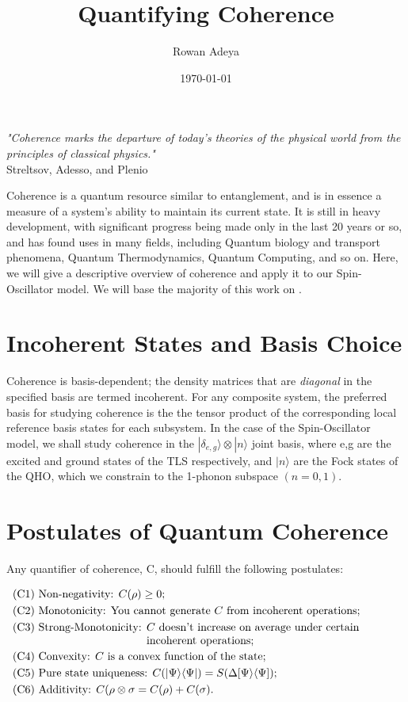 \documentclass[12pt]{article}
\title{Quantifying Coherence}
\author{Rowan Adeya}
\date{\today}
\begin{document}
\maketitle

\begin{center}
\textit{"Coherence marks the departure of today’s theories of the
physical world from the principles of classical physics."}\\ \small{Streltsov, Adesso, and Plenio\cite{...}}\\ 
\end{center}

Coherence is a quantum resource similar to entanglement, and is in essence a measure of a system's ability to maintain its current state. It is still in heavy development, with significant progress being made only in the last 20 years or so, and has found uses in many fields, including Quantum biology and transport phenomena, Quantum Thermodynamics, Quantum Computing, and so on\cite{...}. Here, we will give a descriptive overview of coherence and apply it to our Spin-Oscillator model. We will base the majority of this work on \cite{...}.

\section{Incoherent States and Basis Choice}
Coherence is basis-dependent; the density matrices that are \textit{diagonal} in the specified basis are termed incoherent. For any composite system, the preferred basis for studying coherence is the the tensor product of the corresponding local reference basis states for each subsystem. In the case of the Spin-Oscillator model, we shall study coherence in the $|\delta_{e,g}\rangle \otimes |n\rangle$ joint basis, where e,g are the excited and ground states of the TLS respectively, and $|n\rangle$ are the Fock states of the QHO, which we constrain to the 1-phonon subspace $(n=0,1)$.

\section{Postulates of Quantum Coherence}
Any quantifier of coherence, C, should fulfill the following postulates:

\begin{align}
&\text{(C1) Non-negativity: } C(\rho) \geq 0; \\
&\text{(C2) Monotonicity: } \text{You cannot generate $C$ from incoherent operations}; \\
&\text{(C3) Strong-Monotonicity: } \text{\parbox[t]{8cm}{\raggedright $C$ doesn't increase on average under certain incoherent operations;}} \\
&\text{(C4) Convexity: } \text{$C$ is a convex function of the state;}\\
&\text{(C5) Pure state uniqueness: } C(|\Psi\rangle\langle\Psi|) = S(\Delta[\Psi\rangle\langle\Psi]); \\
&\text{(C6) Additivity: } C(\rho\otimes\sigma = C(\rho) + C(\sigma).
\end{align}
\end{document}
